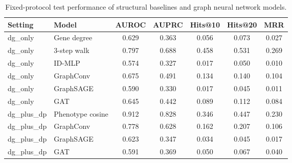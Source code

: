 \begin{table}[htbp]
\centering
\caption{Fixed-protocol test performance of structural baselines and graph neural network models.}
\label{tab:fixed_protocol_results}
\begin{tabular}{llccccc}
\hline
Setting & Model & AUROC & AUPRC & Hits@10 & Hits@20 & MRR \\
\hline
dg_only & Gene degree & 0.629 & 0.363 & 0.056 & 0.073 & 0.027 \\
dg_only & 3-step walk & 0.797 & 0.688 & 0.458 & 0.531 & 0.269 \\
dg_only & ID-MLP & 0.574 & 0.327 & 0.017 & 0.050 & 0.010 \\
dg_only & GraphConv & 0.675 & 0.491 & 0.134 & 0.140 & 0.104 \\
dg_only & GraphSAGE & 0.590 & 0.330 & 0.017 & 0.045 & 0.011 \\
dg_only & GAT & 0.645 & 0.442 & 0.089 & 0.112 & 0.084 \\
dg_plus_dp & Phenotype cosine & 0.912 & 0.828 & 0.346 & 0.447 & 0.230 \\
dg_plus_dp & GraphConv & 0.778 & 0.628 & 0.162 & 0.207 & 0.106 \\
dg_plus_dp & GraphSAGE & 0.623 & 0.347 & 0.034 & 0.045 & 0.017 \\
dg_plus_dp & GAT & 0.591 & 0.369 & 0.050 & 0.067 & 0.040 \\
\hline
\end{tabular}
\end{table}